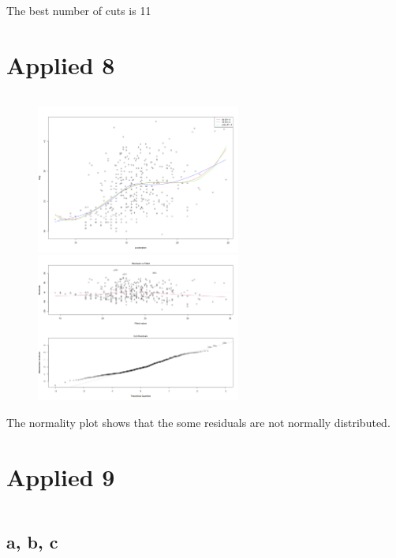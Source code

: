 \documentclass{article}
\begin{document}
\inputminted{r}{src/q6b.R}

The best number of cuts is 11




\newpage
\section*{Applied 8}
\inputminted{r}{src/q8.R}
\newpage
\begin{figure}[h]
    \centering
    \includegraphics[width=0.6\textwidth]{figs/q8-1.png}
    \includegraphics[width=0.6\textwidth]{figs/q8-2.png}
    \caption{}
    \label{fig: q8-1}
\end{figure}

The normality plot shows that the some residuals are not normally distributed.

\newpage
\section*{Applied 9}
\inputminted{r}{src/q9.R}
\subsection*{a, b, c}
\end{document}

